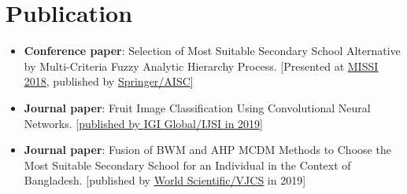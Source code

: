 \documentclass[letter-paper,10pt]{article}
\newcommand{\resumeItem}[2]{
  \item\small{
    \textbf{#1}{: #2 \vspace{-2pt}}
  }
}
\newcommand{\resumeSubItem}[2]{\resumeItem{#1}{#2}\vspace{-3pt}}
\newcommand{\resumeSubHeadingListStart}{\begin{itemize}[leftmargin=*]}
\newcommand{\resumeSubHeadingListEnd}{\end{itemize}}
\begin{document}
\vspace{-3pt}

\section{Publication}
  \resumeSubHeadingListStart
    \resumeSubItem{Conference paper}
      {Selection of Most Suitable Secondary School Alternative by Multi-Criteria Fuzzy Analytic Hierarchy Process. [Presented at \href{https://missi.pwr.edu.pl/2018/}{\underline{MISSI 2018}}, published by \href{https://link.springer.com/chapter/10.1007\%2F978-3-319-98678-4_29}{\underline{Springer/AISC}}]}
    \resumeSubItem{Journal paper}
      {Fruit Image Classification Using Convolutional Neural Networks. [\href{https://www.igi-global.com/gateway/article/236206}{published by \underline{IGI Global/IJSI} in 2019}]}
    \resumeSubItem{Journal paper}
      {Fusion of BWM and AHP MCDM Methods to Choose the Most Suitable Secondary School for an Individual in the Context of Bangladesh. [published by \href{https://www.worldscientific.com/doi/abs/10.1142/S2196888819500167}{\underline{World Scientific/VJCS}} in 2019]}
  \resumeSubHeadingListEnd
\end{document}
